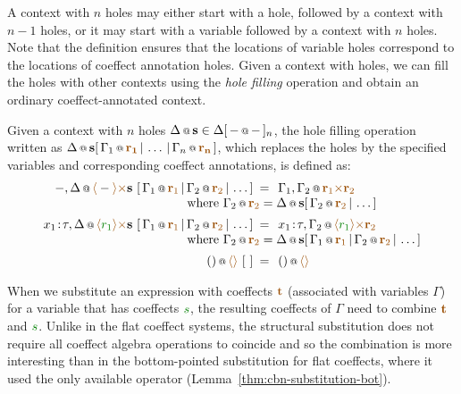 \noindent
A context with $n$ holes may either start with a hole, followed by a context with $n-1$ holes, or it may
start with a variable followed by a context with $n$ holes. Note that the definition ensures that
the locations of variable holes correspond to the locations of coeffect annotation holes. Given a context
with holes, we can fill the holes with other contexts using the \emph{hole filling} operation and
obtain an ordinary coeffect-annotated context.

\begin{definition} Given a context with $n$ holes $\coctx{\Delta}{\textbf{s}} \in 
\Delta[\,\coctx{-}{-}\,]_n$, the hole filling operation written as 
$\coctx{\Delta}{\textbf{s}}[\,\coctx{\Gamma_1}{\aclrd{\mathbf{r_1}}} \,|\, \ldots \,|\, \coctx{\Gamma_n}{\aclrd{\mathbf{r_n}}} \,]$,
which replaces the holes by the specified variables and corresponding coeffect annotations, is defined as:
%
\begin{equation*}
\begin{array}{rcl}
 \coctx{-, \Delta}{\alift{-} \atimes \textbf{s} }
    ~[\,\coctx{\Gamma_1}{\aclrd{\textbf{r}_1}} \,|\, \coctx{\Gamma_2}{\aclrd{\textbf{r}_2}} \,|\, \ldots \,] &\narrow{=}&
      \coctx{\Gamma_1, \Gamma_2}{\aclrd{\textbf{r}_1} \atimes \aclrd{\textbf{r}_2} } \\
 && \qquad \hspace{-9.3em} \textnormal{where}~\coctx{\Gamma_2}{\aclrd{\textbf{r}_2}} =
     \coctx{\Delta}{\textbf{s}}[\, \coctx{\Gamma_2}{\aclrd{\textbf{r}_2}} \,|\, \ldots \,] 
\\[0.5em]
 \coctx{x_1\!:\!\tau, \Delta}{\alift{\cclrd{r_1}} \atimes \textbf{s} }
    ~[\,\coctx{\Gamma_1}{\aclrd{\textbf{r}_1}} \,|\, \coctx{\Gamma_2}{\aclrd{\textbf{r}_2}} \,|\, \ldots \,] &\narrow{=}&
      \coctx{x_1\!:\!\tau, \Gamma_2}{\alift{\cclrd{r_1}} \atimes \aclrd{\textbf{r}_2} } \\
 && \qquad \hspace{-9.3em} \textnormal{where}~\coctx{\Gamma_2}{\aclrd{\textbf{r}_2}} =
     \coctx{\Delta}{\textbf{s}}[\,\coctx{\Gamma_1}{\aclrd{\textbf{r}_1}} \,|\, \coctx{\Gamma_2}{\aclrd{\textbf{r}_2}} \,|\, \ldots \,] 
\\[0.5em]
 \coctx{()}{\alift{}}~[~] &\narrow{=}& \coctx{()}{\alift{}}
\end{array} 
\end{equation*} 
\end{definition}

\noindent
When we substitute an expression with coeffects $\aclrd{\textbf{t}}$ (associated with variables $\Gamma$)
for a variable that has coeffects $\cclrd{s}$, the resulting coeffects of $\Gamma$ need to 
combine $\aclrd{\textbf{t}}$ and $\cclrd{s}$. Unlike in the flat coeffect systems, the structural 
substitution does not require all coeffect algebra operations to coincide and so the combination
is more interesting than in the bottom-pointed substitution for flat coeffects, where it used
the only available operator (Lemma~\ref{thm:cbn-substitution-bot}).

